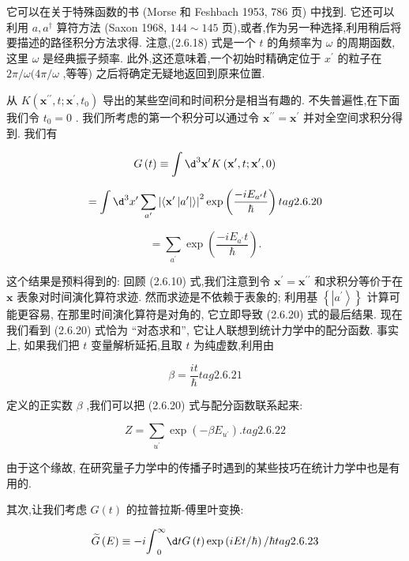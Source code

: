 \documentclass[lang=cn,newtx,10pt,scheme=chinese,thmcnt=section]{elegantbook}
\begin{document}
它可以在关于特殊函数的书 (Morse 和 Feshbach 1953, 786 页) 中找到. 它还可以利用 $a,{a}^{ \dagger }$ 算符方法 (Saxon 1968, ${144} \sim {145}$ 页),或者,作为另一种选择,利用稍后将要描述的路径积分方法求得. 注意,(2.6.18) 式是一个 $t$ 的角频率为 $\omega$ 的周期函数,这里 $\omega$ 是经典振子频率. 此外,这还意味着,一个初始时精确定位于 ${x}^{\prime }$ 的粒子在 ${2\pi }/\omega ({4\pi }/\omega$ ,等等) 之后将确定无疑地返回到原来位置.

从 $K\left( {{\mathbf{x}}^{\prime \prime }, t;{\mathbf{x}}^{\prime },{t}_{0}}\right)$ 导出的某些空间和时间积分是相当有趣的. 不失普遍性,在下面我们令 ${t}_{0} = 0$ . 我们所考虑的第一个积分可以通过令 ${\mathbf{x}}^{\prime \prime } = {\mathbf{x}}^{\prime }$ 并对全空间求积分得到. 我们有

$$
G\left( t\right) \equiv \int {\d}^{3}{\mathbf{x}}^{\prime }K\left( {{\mathbf{x}}^{\prime }, t;{\mathbf{x}}^{\prime },0}\right)
$$

$$
= \int {\d}^{3}{x}^{\prime }\mathop{\sum }\limits_{{a}^{\prime }}{\left| \left\langle {\mathbf{x}}^{\prime }\left| {a}^{\prime }\right| \right\rangle \right| }^{2}\exp \left( \frac{-i{E}_{{a}^{\prime }}t}{\hbar }\right) tag{2.6.20}
$$

$$
= \mathop{\sum }\limits_{{a}^{\prime }}\exp \left( \frac{-i{E}_{{a}^{\prime }}t}{\hbar }\right) .
$$

这个结果是预料得到的: 回顾 (2.6.10) 式,我们注意到令 ${\mathbf{x}}^{\prime } = {\mathbf{x}}^{\prime \prime }$ 和求积分等价于在 $\mathbf{x}$ 表象对时间演化算符求迹. 然而求迹是不依赖于表象的; 利用基 $\left\{ \left| {a}^{\prime }\right\rangle \right\}$ 计算可能更容易, 在那里时间演化算符是对角的, 它立即导致 (2.6.20) 式的最后结果. 现在我们看到 (2.6.20) 式恰为 “对态求和”, 它让人联想到统计力学中的配分函数. 事实上, 如果我们把 $t$ 变量解析延拓,且取 $t$ 为纯虚数,利用由

$$
\beta = \frac{it}{\hbar } tag{2.6.21}
$$

定义的正实数 $\beta$ ,我们可以把 (2.6.20) 式与配分函数联系起来:

$$
Z = \mathop{\sum }\limits_{{u}^{\prime }}\exp \left( {-\beta {E}_{{u}^{\prime }}}\right) . tag{2.6.22}
$$

由于这个缘故, 在研究量子力学中的传播子时遇到的某些技巧在统计力学中也是有用的.

其次,让我们考虑 $G\left( t\right)$ 的拉普拉斯-傅里叶变换:

$$
\widetilde{G}\left( E\right) \equiv - i{\int }_{0}^{\infty }{\d tG}\left( t\right) \exp \left( {{iEt}/\hbar }\right) /\hbar tag{2.6.23}
$$
\end{document}
